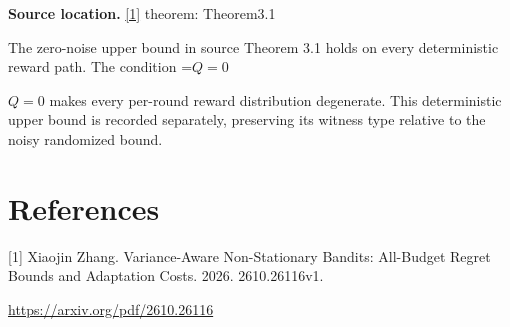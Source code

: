 \documentclass[10pt,a4paper]{article}
\newcommand{\AtlasMath}[1]{\par\begingroup\centering\setbox0=\hbox{$\displaystyle #1$}\ifdim\wd0>1.4\linewidth\typeout{ATLAS WIDE FORMULA: \the\wd0}\fi\ifdim\wd0>\linewidth\resizebox{\linewidth}{!}{\box0}\else\box0\fi\par\endgroup}
\newcommand{\AtlasInlineMath}[1]{\begingroup\setbox0=\hbox{$#1$}\ifdim\wd0>.4\linewidth\endgroup\AtlasMath{#1}\else\endgroup$#1$\fi}
\begin{document}
\textbf{Source location.} \href{https://arxiv.org/pdf/2610.26116}{[1]} theorem: Theorem3.1

The zero-noise upper bound in source Theorem 3.1 holds on every deterministic reward path. The condition \AtlasInlineMath{Q=0} makes every per-round reward distribution degenerate. This deterministic upper bound is recorded separately, preserving its witness type relative to the noisy randomized bound.

\section{References}
[1] Xiaojin Zhang. Variance-Aware Non-Stationary Bandits: All-Budget Regret Bounds and Adaptation Costs. 2026. 2610.26116v1.

\url{https://arxiv.org/pdf/2610.26116}
\end{document}

